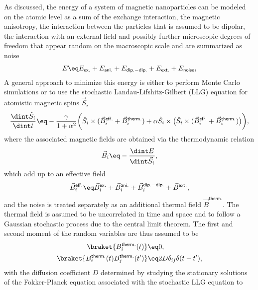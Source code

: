 \documentclass[\main/dresen_thesis.tex]{subfiles}
\begin{document}
      As discussed, the energy of a system of magnetic nanoparticles can be modeled on the atomic level as a sum of the exchange interaction, the magnetic anisotropy, the interaction between the particles that is assumed to be dipolar, the interaction with an external field and possibly further microscopic degrees of freedom that appear random on the macroscopic scale and are summarized as noise
      \begin{align}
        E \eq E_\mathsf{ex.} + E_\mathsf{ani.} + E_\mathsf{dip.-dip.} + E_\mathsf{ext.} + E_\mathsf{noise},
      \end{align}
      A general approach to minimize this energy is either to perform Monte Carlo simulations or to use the stochastic Landau-Lifshitz-Gilbert (LLG) equation \cite{Fidler_2000_Micro, Scholz_1999_Micro} for atomistic magnetic spins $\vec{S}_i$
      \begin{align}
        \frac{\dint \hat{S}_i}{\dint t} \eq
          - \frac{\gamma}{1 + \alpha^2} \biggl(
            \hat{S}_i \times (\vec{B}_i^\mathsf{eff.} + \vec{B}^\mathsf{therm.}_i) +
            \alpha \hat{S}_i \times \bigl(\hat{S}_i \times (\vec{B}_i^\mathsf{eff.} +\vec{B}^\mathsf{therm.}_i) \bigr) \biggr),
      \end{align}
      where the associated magnetic fields are obtained via the thermodynamic relation
      \begin{align}
        \vec{B}_i \eq - \frac{\dint E}{\dint \vec{S}_i},
      \end{align}
      which add up to an effective field
      \begin{align}
        \vec{B}^\mathsf{eff.}_i \eq \vec{B}^\mathsf{ex.}_i + \vec{B}^\mathsf{ani.}_i + \vec{B}^\mathsf{dip.-dip.}_i + \vec{B}^\mathsf{ext.},
      \end{align}
      and the noise is treated separately as an additional thermal field $\vec{B}^\mathsf{therm.}$.
      The thermal field is assumed to be uncorrelated in time and space and to follow a Gaussian stochastic process due to the central limit theorem.
      The first and second moment of the random variables are thus assumed to be
      \begin{align}
        \braket{B^\mathsf{therm.}_i (t)} &\eq 0,\\
        \braket{B^\mathsf{therm.}_i (t) B^\mathsf{therm.}_j (t^\prime)} &\eq 2 D \delta_{ij} \delta(t - t^\prime),
      \end{align}
      with the diffusion coefficient $D$ determined by studying the stationary solutions of the Fokker-Planck equation associated with the stochastic LLG equation to \cite{Garcia_1998_Lange}
\end{document}
